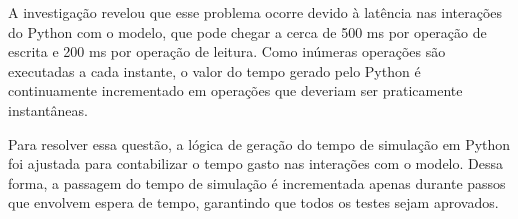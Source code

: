 A investigação revelou que esse problema ocorre devido à latência nas interações do Python com o modelo, que pode chegar a cerca de 500 ms por operação de escrita e 
200 ms por operação de leitura. Como inúmeras operações são executadas a cada instante, o valor do tempo gerado pelo Python é continuamente incrementado em operações 
que deveriam ser praticamente instantâneas.

Para resolver essa questão, a lógica de geração do tempo de simulação em Python foi ajustada para contabilizar o tempo gasto nas interações com o modelo. Dessa forma, 
a passagem do tempo de simulação é incrementada apenas durante passos que envolvem espera de tempo, garantindo que todos os testes sejam aprovados.

